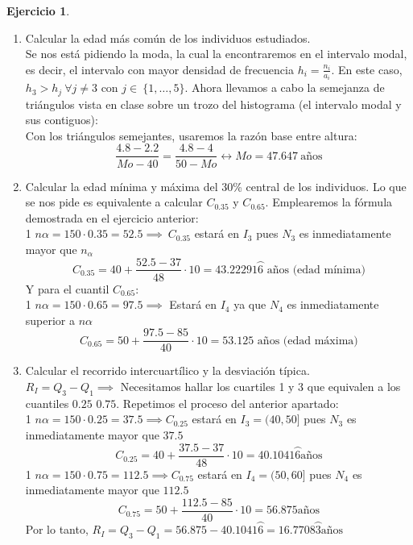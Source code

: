 \documentclass[a4paper, 12pt]{article}
\theoremstyle{definition}
\newtheorem{ej}{Ejercicio}
\begin{document}
\begin{ej}
\begin{enumerate}[label=\textit{\alph*)}]
    \item Calcular la edad más común de los individuos estudiados. \\
    Se nos está pidiendo la moda, la cual la encontraremos en el intervalo modal, es decir, el intervalo con mayor densidad de frecuencia $h_{i} = \frac{n_{i}}{a_{i}}$. En este caso, $h_{3} > h_{j} \ \forall j \not = 3$ con $j \in \ \{1,\dots,5\}$. Ahora llevamos a cabo la semejanza de triángulos vista en clase sobre un trozo del histograma (el intervalo modal y sus contiguos): \\
    Con los triángulos semejantes, usaremos la razón base entre altura: 
    $$\frac{4.8-2.2}{Mo - 40} = \frac{4.8 - 4}{50 - Mo} \longleftrightarrow Mo= 47.647 \ \text{años} $$
    \item Calcular la edad mínima y máxima del 30\% central de los individuos.
    Lo que se nos pide es equivalente a calcular $C_{0.35}$ y $C_{0.65}$. Emplearemos la fórmula demostrada en el ejercicio anterior: \\
    1 $n\alpha = 150\cdot0.35 = 52.5 \implies \ C_{0.35}$ estará en $I_{3}$ pues $N_{3}$ es inmediatamente mayor que $n_{\alpha}$ \\
    $$C_{0.35} = 40 + \frac{52.5 - 37}{48} \cdot 10 = 43.22291\wideparen{6} \text{ años (edad mínima)}$$
    Y para el cuantil $C_{0.65}$:\\
    1 $n\alpha = 150\cdot0.65 = 97.5 \implies$ Estará en $I_{4}$ ya que $N_{4}$ es inmediatamente superior a $n\alpha$
    $$C_{0.65} = 50 + \frac{97.5 - 85}{40} \cdot 10 = 53.125 \text{ años (edad máxima)}$$
    \item Calcular el recorrido intercuartílico y la desviación típica.\\
    $R_{I} = Q_{3} - Q_{1} \implies$ Necesitamos hallar los cuartiles 1 y 3 que equivalen a los cuantiles $0.25$ $0.75$. Repetimos el proceso del anterior apartado: \\
    1 $n\alpha = 150 \cdot 0.25 = 37.5 \implies C_{0.25}$ estará en $I_{3} = (40,50]$ pues $N_{3}$ es inmediatamente mayor que $37.5$
    $$C_{0.25} = 40 + \frac{37.5-37}{48} \cdot 10 = 40.1041\wideparen{6} \text{años}$$
    1 $n\alpha = 150 \cdot 0.75 = 112.5 \implies C_{0.75}$ estará en $I_{4} = (50,60]$ pues $N_{4}$ es inmediatamente mayor que $112.5$
    $$C_{0.75} = 50 + \frac{112.5-85}{40} \cdot 10 = 56.875 \text{años}$$
    Por lo tanto, $R_{I} = Q_{3} - Q_{1} = 56.875 - 40.1041\wideparen{6} = 16.7708\wideparen{3} \text{años}$ \\

\end{enumerate}
\end{ej}
\end{document}
